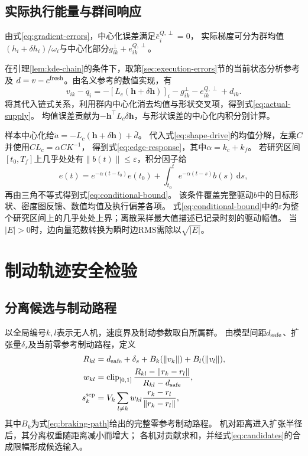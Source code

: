 \documentclass[UTF8,a4paper,11pt,fontset=none]{ctexart}
\begin{document}
\subsection{实际执行能量与群间响应}
由式\eqref{eq:gradient-errors}，中心化误差满足$\bar e_i^{Q,\perp}=0$，
实际梯度可分为群均值$(h_i+\delta h_i)/\omega_i$与中心化部分$g_{ik}^{\perp}+e_{ik}^{Q,\perp}$。

在引理\ref{lem:kde-chain}的条件下，取第\ref{sec:execution-errors}节的当前状态分析参考及
$d=v-c^{\rm fresh}$。由名义参考的数值实现，有
\[
v_{ik}-\dot q_i
=-[L_c(\mathbf h+\delta\mathbf h)]_i-g^\perp_{ik}-e^{Q,\perp}_{ik}+d_{ik} .
\]
将其代入链式关系，利用群内中心化消去均值与形状交叉项，得到式\eqref{eq:actual-supply}。
均值误差贡献为$-\mathbf h^\top L_c\delta\mathbf h$，与形状误差的中心化内积分别计算。

样本中心化给$\dot a=-L_c(\mathbf h+\delta\mathbf h)+\bar d$。
代入式\eqref{eq:shape-drive}的均值分解，左乘$C$并使用$CL_c=\alpha CK^{-1}$，
得到式\eqref{eq:edge-response}，其中$\alpha=k_c+k_f$。
若研究区间$[t_0,T_f]$上几乎处处有$\|b(t)\|\le\varepsilon$，积分因子给
\[
e(t)=e^{-\alpha(t-t_0)}e(t_0)+\int_{t_0}^t e^{-\alpha(t-s)}b(s)\,\mathrm ds,
\]
再由三角不等式得到式\eqref{eq:conditional-bound}。
该条件覆盖完整驱动$b$中的目标形状、密度图反馈、数值均值及执行偏差各项。
式\eqref{eq:conditional-bound}中的$\varepsilon$为整个研究区间上的几乎处处上界；离散采样最大值描述已记录时刻的驱动幅值。
当$|E|>0$时，边向量范数转换为瞬时边RMS需除以$\sqrt{|E|}$。

\section{制动轨迹安全检验}\label{app:braking}

\subsection{分离候选与制动路程}\label{app:separation}
以全局编号$k,l$表示无人机，速度界及制动参数取自所属群。
由模型间距$d_{\rm safe}$、扩张量$\delta_s$及当前零参考制动路程，定义
\begin{equation}
\begin{aligned}
R_{kl}&=d_{\rm safe}+\delta_s+B_k(\|v_k\|)+B_l(\|v_l\|),\\
w_{kl}&=\operatorname{clip}_{[0,1]}\frac{R_{kl}-\|r_k-r_l\|}{R_{kl}-d_{\rm safe}},\\
s_k^{\rm sep}&=V_k\sum_{l\ne k}w_{kl}\frac{r_k-r_l}{\|r_k-r_l\|},
\end{aligned}
\label{eq:separation}
\end{equation}
其中$B_k$为式\eqref{eq:braking-path}给出的完整零参考制动路程。
机对距离进入扩张半径后，其分离权重随距离减小而增大；
各机对贡献求和，并经式\eqref{eq:candidates}的合成限幅形成候选输入。
\end{document}
